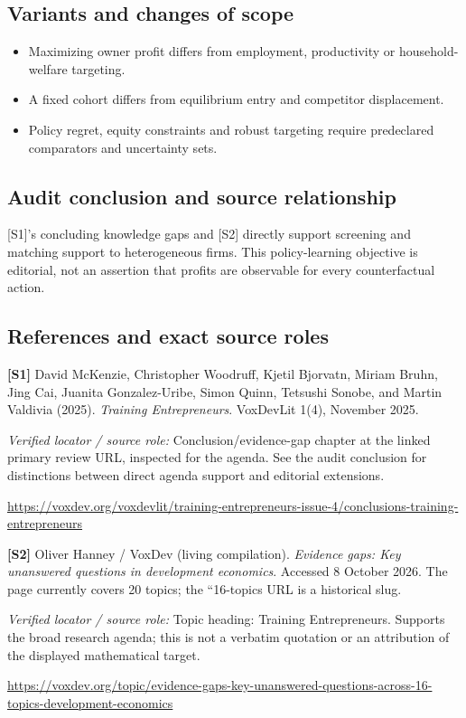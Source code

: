 \documentclass[11pt,a4paper]{article}
\begin{document}
\subsection*{Variants and changes of scope}

\begin{itemize}
\item Maximizing owner profit differs from employment, productivity or household-welfare targeting.
\item A fixed cohort differs from equilibrium entry and competitor displacement.
\item Policy regret, equity constraints and robust targeting require predeclared comparators and uncertainty sets.
\end{itemize}

\subsection*{Audit conclusion and source relationship}

[S1]'s concluding knowledge gaps and [S2] directly support screening and matching support to heterogeneous firms. This policy-learning objective is editorial, not an assertion that profits are observable for every counterfactual action.

\subsection*{References and exact source roles}

{\footnotesize\raggedright
\par\noindent\textbf{[S1]} David McKenzie, Christopher Woodruff, Kjetil Bjorvatn, Miriam Bruhn, Jing Cai, Juanita Gonzalez-Uribe, Simon Quinn, Tetsushi Sonobe, and Martin Valdivia (2025). \emph{Training Entrepreneurs}. VoxDevLit 1(4), November 2025.\par \textit{Verified locator / source role:} Conclusion/evidence-gap chapter at the linked primary review URL, inspected for the agenda. See the audit conclusion for distinctions between direct agenda support and editorial extensions.\par \url{https://voxdev.org/voxdevlit/training-entrepreneurs-issue-4/conclusions-training-entrepreneurs}\par\smallskip
\par\noindent\textbf{[S2]} Oliver Hanney / VoxDev (living compilation). \emph{Evidence gaps: Key unanswered questions in development economics}. Accessed 8 October 2026. The page currently covers 20 topics; the ``16-topics URL is a historical slug.\par \textit{Verified locator / source role:} Topic heading: Training Entrepreneurs. Supports the broad research agenda; this is not a verbatim quotation or an attribution of the displayed mathematical target.\par \url{https://voxdev.org/topic/evidence-gaps-key-unanswered-questions-across-16-topics-development-economics}\par\smallskip
}
\end{document}
